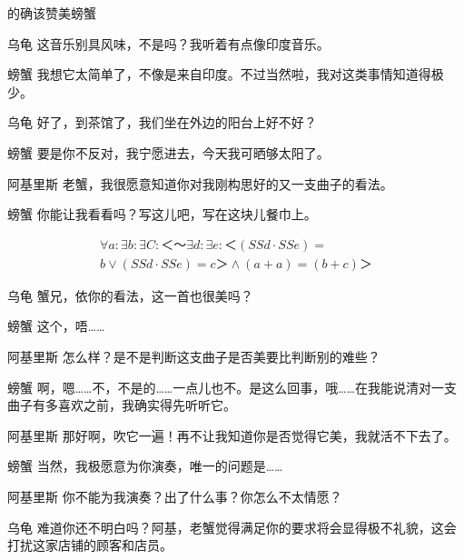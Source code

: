 \begin{dialog}{的确该赞美螃蟹}
\begin{dialogue}
\item[乌龟]这音乐别具风味，不是吗？我听着有点像印度音乐。

\item[螃蟹]我想它太简单了，不像是来自印度。不过当然啦，我对这类事情知道得极少。

\item[乌龟]好了，到茶馆了，我们坐在外边的阳台上好不好？

\item[螃蟹]要是你不反对，我宁愿进去，今天我可晒够太阳了。


\item[阿基里斯]老蟹，我很愿意知道你对我刚构思好的又一支曲子的看法。

\item[螃蟹]你能让我看看吗？写这儿吧，写在这块儿餐巾上。

\begin{multline*}
\forall a:\exists b:\exists C:＜～\exists d:\exists e:＜(SSd\cdot SSe)=\\
b∨(SSd\cdot SSe)=c＞∧(a+a)=(b+c)＞
\end{multline*}

\item[乌龟]蟹兄，依你的看法，这一首也很美吗？

\item[螃蟹]这个，唔……

\item[阿基里斯]怎么样？是不是判断这支曲子是否美要比判断别的难些？

\item[螃蟹]啊，嗯……不，不是的……一点儿也不。是这么回事，哦……在我能说清对一支曲子有多喜欢之前，我确实得先听听它。

\item[阿基里斯]那好啊，吹它一遍！再不让我知道你是否觉得它美，我就活不下去了。

\item[螃蟹]当然，我极愿意为你演奏，唯一的问题是……

\item[阿基里斯]你不能为我演奏？出了什么事？你怎么不太情愿？

\item[乌龟]难道你还不明白吗？阿基，老蟹觉得满足你的要求将会显得极不礼貌，这会打扰这家店铺的顾客和店员。


\end{dialogue}
\end{dialog}
